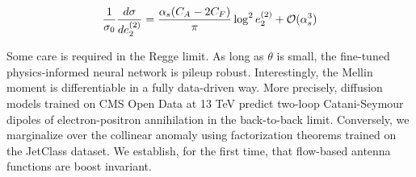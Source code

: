 \begin{equation}
  \frac{1}{\sigma_0} \frac{d\sigma}{de_2^{(2)}} = \frac{\alpha_s (C_A - 2C_F)}{\pi} \log^2 e_2^{(2)} + \mathcal{O}(\alpha_s^{3})
  \label{eq:3}
\end{equation}

Some care is required in the Regge limit. As long as $\theta$ is small,
the fine-tuned physics-informed neural network is pileup robust.
Interestingly, the Mellin moment is differentiable in a fully
data-driven way. More precisely, diffusion models trained on CMS Open
Data at 13 TeV predict two-loop Catani-Seymour dipoles of
electron-positron annihilation in the back-to-back limit. Conversely, we
marginalize over the collinear anomaly using factorization theorems
trained on the JetClass dataset. We establish, for the first time, that
flow-based antenna functions are boost invariant.

